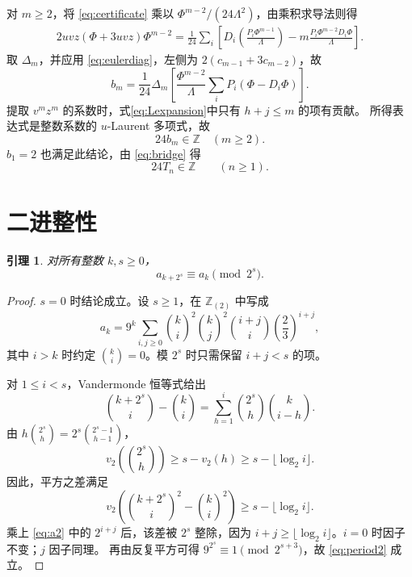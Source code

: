 \documentclass[a4paper,11pt]{article}
\numberwithin{equation}{section}
\theoremstyle{chinese}
\newtheorem{lemma}{引理}[section]
\newcommand{\Z}{\mathbb Z}
\newcommand{\diag}{\Delta}
\begin{document}
对 $m\ge2$，将 \eqref{eq:certificate} 乘以 $\Phi^{m-2}/(24\Lambda^2)$，由乘积求导法则得
\begin{equation}\label{eq:parts}
\begin{split}
2uvz(\Phi+3uvz)\Phi^{m-2}
=\frac1{24}\sum_i\left[
D_i\!\left(\frac{P_i\Phi^{m-1}}\Lambda\right)
-m\frac{P_i\Phi^{m-2}D_i\Phi}{\Lambda}\right].
\end{split}
\end{equation}
取 $\diag_m$，并应用 \eqref{eq:eulerdiag}，左侧为
$2(c_{m-1}+3c_{m-2})$，故
\begin{equation}\label{eq:bcertificate}
\displaystyle
b_m=\frac1{24}\diag_m\left[
\frac{\Phi^{m-2}}\Lambda\sum_iP_i(\Phi-D_i\Phi)\right].
\end{equation}
提取 $v^mz^m$ 的系数时，式\eqref{eq:Lexpansion}中只有 $h+j\le m$ 的项有贡献。
所得表达式是整数系数的 $u$-Laurent 多项式，故
\begin{equation}\label{eq:b24}
24b_m\in\Z\quad(m\ge2).
\end{equation}
$b_1=2$ 也满足此结论，由 \eqref{eq:bridge} 得
\begin{equation}\label{eq:T24}
24T_n\in\Z\qquad(n\ge1).
\end{equation}

\section{二进整性}
\begin{lemma}\label{lem:period2}
对所有整数 $k,s\ge0$，
\begin{equation}\label{eq:period2}
a_{k+2^s}\equiv a_k\pmod{2^s}.
\end{equation}
\end{lemma}
\begin{proof}
$s=0$ 时结论成立。设 $s\ge1$，在 $\Z_{(2)}$ 中写成
\begin{equation}\label{eq:a2}
a_k=9^k\sum_{i,j\ge0}\binom ki^2\binom kj^2
\binom{i+j}{i}\left(\frac23\right)^{i+j},
\end{equation}
其中 $i>k$ 时约定 $\binom ki=0$。模 $2^s$ 时只需保留 $i+j<s$ 的项。

对 $1\le i<s$，Vandermonde 恒等式给出
\[
\binom{k+2^s}{i}-\binom ki
=\sum_{h=1}^i\binom{2^s}{h}\binom{k}{i-h}.
\]
由 $h\binom{2^s}{h}=2^s\binom{2^s-1}{h-1}$，
\[
v_2\!\left(\binom{2^s}{h}\right)
\ge s-v_2(h)\ge s-\lfloor\log_2 i\rfloor.
\]
因此，平方之差满足
\begin{equation}\label{eq:2bindiff}
v_2\!\left(\binom{k+2^s}{i}^{\!2}-\binom ki^2\right)
\ge s-\lfloor\log_2 i\rfloor.
\end{equation}
乘上 \eqref{eq:a2} 中的 $2^{i+j}$ 后，该差被 $2^s$ 整除，因为
$i+j\ge\lfloor\log_2 i\rfloor$。$i=0$ 时因子不变；$j$ 因子同理。
再由反复平方可得 $9^{2^s}\equiv1\pmod{2^{s+3}}$，故 \eqref{eq:period2} 成立。
\end{proof}
\end{document}
